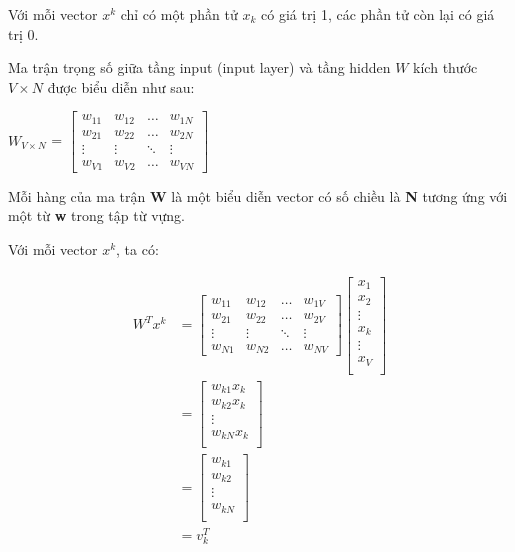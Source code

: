 Với mỗi vector $x^{k}$ chỉ có một phần tử $x_{k}$ có giá trị 1, các phần tử còn lại có giá trị 0.

Ma trận trọng số giữa tầng input (input layer) và tầng hidden $W$ kích thước $V\times N$ được biểu diễn như sau:
\begin{center}
    $W_{V\times N}$ =
    $\begin{bmatrix}
        w_{11} & w_{12} & \dots & w_{1N}\\
        w_{21} & w_{22} & \dots & w_{2N} \\
        \vdots & \vdots & \ddots & \vdots \\
        w_{V1} & w_{V2} & \dots & w_{VN}
    \end{bmatrix}$
\end{center}

Mỗi hàng của ma trận \textbf{W}  là một biểu diễn vector có số chiều là \textbf{N} tương ứng với một từ \textbf{w} trong tập từ vựng.

Với mỗi vector $x^{k}$, ta có: 
\begin{center}
    \begin{equation}
        \begin{split}
            W^T x^{k} & = 
            \begin{bmatrix}
            w_{11} & w_{12} & \dots & w_{1V}\\
            w_{21} & w_{22} & \dots & w_{2V} \\
            \vdots & \vdots & \ddots & \vdots \\
            w_{N1} & w_{N2} & \dots & w_{NV}
        \end{bmatrix}
        \begin{bmatrix}
            x_{1}\\
            x_{2} \\
            \vdots \\
            x_{k} \\
            \vdots \\
            x_{V} \\
        \end{bmatrix} \\
         & = 
        \begin{bmatrix}
            w_{k1}x_{k}\\
            w_{k2}x_{k} \\
            \vdots \\
            w_{kN}x_{k} \\
        \end{bmatrix} \\
         & = 
        \begin{bmatrix}
            w_{k1}\\
            w_{k2} \\
            \vdots \\
            w_{kN} \\
        \end{bmatrix} \\
         & = v^T_{k}
        \end{split}
    \end{equation}
\end{center}

